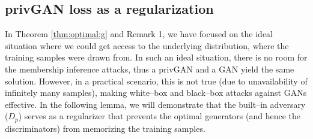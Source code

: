 \documentclass{article}
\begin{document}
\subsection{privGAN loss as a regularization}
\label{privGAN:reg}
In Theorem \ref{thm:optimal:g} and Remark 1, we have focused on the ideal situation where we could get access to the underlying distribution, where the training samples were drawn from. In such an ideal situation, there is no room for the membership inference attacks, thus a privGAN and a GAN yield the same solution. However, in a practical scenario, this is not true (due to unavailability of infinitely many samples), making white--box and black--box attacks against GANs effective. In the following lemma, we will demonstrate that the built--in adversary ($D_p$) serves as a regularizer that prevents the optimal generators (and hence the discriminators) from memorizing the training samples. 
\end{document}

